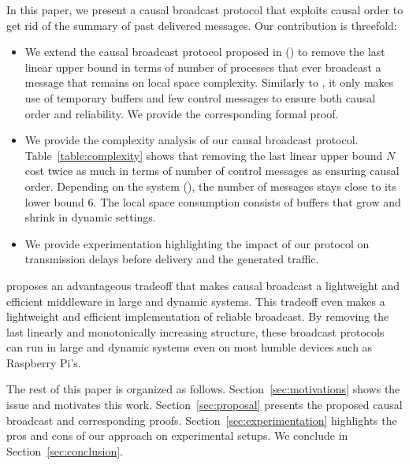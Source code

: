 In this paper, we present a causal broadcast protocol that exploits causal order
to get rid of the summary of past delivered messages. 
Our contribution is threefold:
\begin{itemize}[leftmargin=*]
\item We extend the causal broadcast protocol proposed in (\REF) to remove the
  last linear upper bound in terms of number of processes that ever broadcast a
  message that remains on local space complexity. Similarly to \REF, it only
  makes use of temporary buffers and few control messages to ensure both causal
  order and reliability. We provide the corresponding formal proof.
\item We provide the complexity analysis of our causal broadcast
  protocol. Table~\ref{table:complexity} shows that removing the last linear
  upper bound $N$ cost twice as much in terms of number of control messages as
  ensuring causal order. Depending on the system (\REF), the number of messages
  stays close to its lower bound $6$. The local space consumption consists of
  buffers that grow and shrink in dynamic settings.
\item We provide experimentation highlighting the impact of our protocol on
  transmission delays before delivery and the generated traffic. 
\end{itemize}
\RPCBROADCAST proposes an advantageous tradeoff that makes causal broadcast a
lightweight and efficient middleware in large and dynamic systems. This tradeoff
even makes \RPCBROADCAST a lightweight and efficient implementation of reliable
broadcast. By removing the last linearly and monotonically increasing structure,
these broadcast protocols can run in large and dynamic systems even on most
humble devices such as Raspberry Pi's. 

The rest of this paper is organized as follows. Section~\ref{sec:motivations}
shows the issue and motivates this work. Section~\ref{sec:proposal} presents the
proposed causal broadcast and corresponding
proofs. Section~\ref{sec:experimentation} highlights the pros and cons of our
approach on experimental setups. We conclude in Section~\ref{sec:conclusion}.


